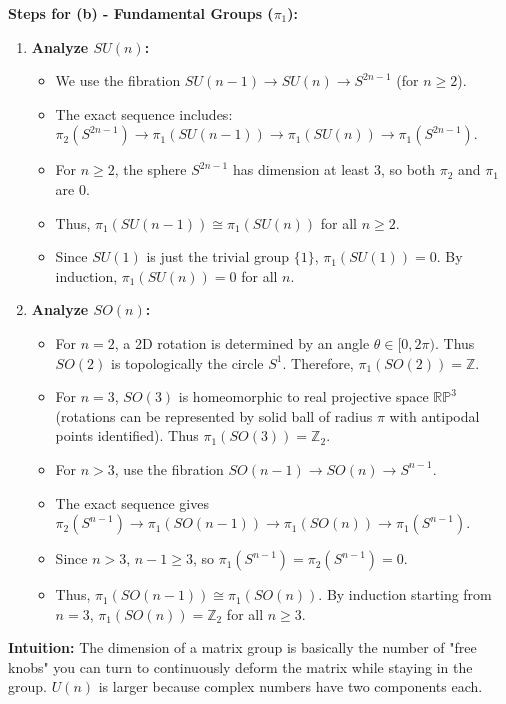 \begin{solution}
\medskip
\textbf{Steps for (b) - Fundamental Groups ($\pi_1$):}
\begin{enumerate}
    \item \textbf{Analyze $SU(n)$:} 
    \begin{itemize}
        \item We use the fibration $SU(n-1) \to SU(n) \to S^{2n-1}$ (for $n \ge 2$).
        \item The exact sequence includes: $\pi_2(S^{2n-1}) \to \pi_1(SU(n-1)) \to \pi_1(SU(n)) \to \pi_1(S^{2n-1})$.
        \item For $n \ge 2$, the sphere $S^{2n-1}$ has dimension at least 3, so both $\pi_2$ and $\pi_1$ are $0$.
        \item Thus, $\pi_1(SU(n-1)) \cong \pi_1(SU(n))$ for all $n \ge 2$. 
        \item Since $SU(1)$ is just the trivial group $\{1\}$, $\pi_1(SU(1)) = 0$. By induction, $\pi_1(SU(n)) = 0$ for all $n$.
    \end{itemize}
    \item \textbf{Analyze $SO(n)$:}
    \begin{itemize}
        \item For $n=2$, a 2D rotation is determined by an angle $\theta \in [0, 2\pi)$. Thus $SO(2)$ is topologically the circle $S^1$. Therefore, $\pi_1(SO(2)) = \mathbb{Z}$.
        \item For $n=3$, $SO(3)$ is homeomorphic to real projective space $\mathbb{RP}^3$ (rotations can be represented by solid ball of radius $\pi$ with antipodal points identified). Thus $\pi_1(SO(3)) = \mathbb{Z}_2$.
        \item For $n > 3$, use the fibration $SO(n-1) \to SO(n) \to S^{n-1}$.
        \item The exact sequence gives $\pi_2(S^{n-1}) \to \pi_1(SO(n-1)) \to \pi_1(SO(n)) \to \pi_1(S^{n-1})$.
        \item Since $n > 3$, $n-1 \ge 3$, so $\pi_1(S^{n-1}) = \pi_2(S^{n-1}) = 0$.
        \item Thus, $\pi_1(SO(n-1)) \cong \pi_1(SO(n))$. By induction starting from $n=3$, $\pi_1(SO(n)) = \mathbb{Z}_2$ for all $n \ge 3$.
    \end{itemize}
\end{enumerate}

\medskip
\textbf{Intuition:}
The dimension of a matrix group is basically the number of "free knobs" you can turn to continuously deform the matrix while staying in the group. $U(n)$ is larger because complex numbers have two components each. 


\end{solution}
